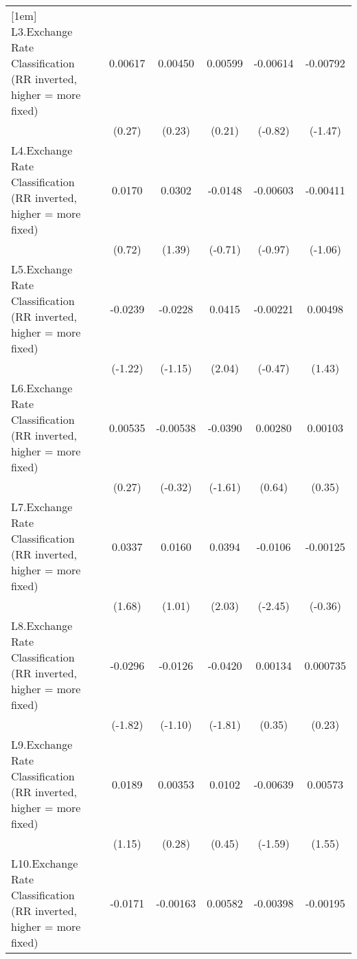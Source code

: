 {\begin{longtable}{l*{5}{c}}
[1em]
L3.Exchange Rate Classification (RR inverted, higher = more fixed)&  0.00617         &  0.00450         &  0.00599         & -0.00614         & -0.00792         \\
                &   (0.27)         &   (0.23)         &   (0.21)         &  (-0.82)         &  (-1.47)         \\
[1em]
L4.Exchange Rate Classification (RR inverted, higher = more fixed)&   0.0170         &   0.0302         &  -0.0148         & -0.00603         & -0.00411         \\
                &   (0.72)         &   (1.39)         &  (-0.71)         &  (-0.97)         &  (-1.06)         \\
[1em]
L5.Exchange Rate Classification (RR inverted, higher = more fixed)&  -0.0239         &  -0.0228         &   0.0415\sym{*}  & -0.00221         &  0.00498         \\
                &  (-1.22)         &  (-1.15)         &   (2.04)         &  (-0.47)         &   (1.43)         \\
[1em]
L6.Exchange Rate Classification (RR inverted, higher = more fixed)&  0.00535         & -0.00538         &  -0.0390         &  0.00280         &  0.00103         \\
                &   (0.27)         &  (-0.32)         &  (-1.61)         &   (0.64)         &   (0.35)         \\
[1em]
L7.Exchange Rate Classification (RR inverted, higher = more fixed)&   0.0337         &   0.0160         &   0.0394\sym{*}  &  -0.0106\sym{*}  & -0.00125         \\
                &   (1.68)         &   (1.01)         &   (2.03)         &  (-2.45)         &  (-0.36)         \\
[1em]
L8.Exchange Rate Classification (RR inverted, higher = more fixed)&  -0.0296         &  -0.0126         &  -0.0420         &  0.00134         & 0.000735         \\
                &  (-1.82)         &  (-1.10)         &  (-1.81)         &   (0.35)         &   (0.23)         \\
[1em]
L9.Exchange Rate Classification (RR inverted, higher = more fixed)&   0.0189         &  0.00353         &   0.0102         & -0.00639         &  0.00573         \\
                &   (1.15)         &   (0.28)         &   (0.45)         &  (-1.59)         &   (1.55)         \\
[1em]
L10.Exchange Rate Classification (RR inverted, higher = more fixed)&  -0.0171         & -0.00163         &  0.00582         & -0.00398         & -0.00195         \\

\end{longtable}}
